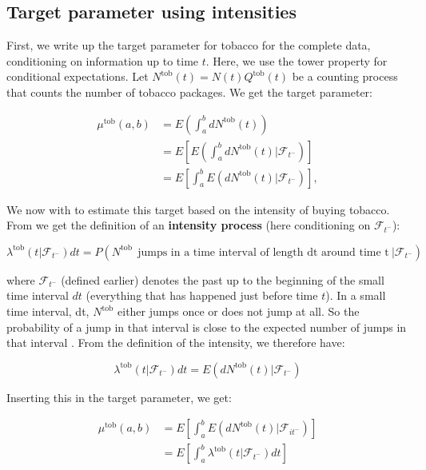 \documentclass[
  11pt,
]{article}
\begin{document}
\hypertarget{target-parameter-using-intensities}{%
\subsection{Target parameter using
intensities}\label{target-parameter-using-intensities}}

First, we write up the target parameter for tobacco for the complete
data, conditioning on information up to time \(t\). Here, we use the
tower property for conditional expectations. Let
\(N^{\text{tob}}(t)=N(t) Q^{\text{tob}}(t)\) be a counting process that
counts the number of tobacco packages. We get the target parameter:

\begin{align*}
\mu^{\text{tob}}(a, b) &= E(\int_a^b dN^{\text{tob}}(t))\\ 
&= E \left[ E(\int_a^b dN^{\text{tob}}(t) | \mathcal{F}_{t^-}) \right] \\
&= E \left[\int_a^b E(dN^{\text{tob}}(t) | \mathcal{F}_{t^-}) \right],
\end{align*}

We now with to estimate this target based on the intensity of buying
tobacco. From \cite{gill84} we get the definition of an
\textbf{intensity process} (here conditioning on \(\mathcal{F}_{t^-}\)):

\begin{equation}
\label{intensity}
\lambda^{\text{tob}} (t | \mathcal{F}_{t^-}) dt =P(N^{\text{tob}} \ \ \text{jumps in a time interval of length dt around time t} \ |  \mathcal{F}_{t^-})
\end{equation}

where \(\mathcal{F}_{t^-}\) (defined earlier) denotes the past up to the
beginning of the small time interval \(dt\) (everything that has
happened just before time \(t\)). In a small time interval, dt,
\(N^{\text{tob}}\) either jumps once or does not jump at all. So the
probability of a jump in that interval is close to the expected number
of jumps in that interval \cite{gill84}. From the definition of the
intensity, we therefore have:

\[
\lambda^{\text{tob}} (t|\mathcal{F}_{t^-}) dt = E(dN^{\text{tob}}(t)| \mathcal{F}_{t^-})
\]

Inserting this in the target parameter, we get:

\begin{align*}
\mu^{\text{tob}}(a, b) &= E \left[\int_a^b E(dN^{\text{tob}}(t) | \mathcal{F}_{it^-}) \right] \\
&= E \left[\int_a^b \lambda^{\text{tob}} (t|\mathcal{F}_{t^-}) dt\right]
\end{align*}
\end{document}

